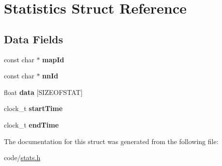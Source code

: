 \hypertarget{structStatistics}{}\section{Statistics Struct Reference}
\label{structStatistics}
\subsection*{Data Fields}
\begin{DoxyCompactItemize}
\item 
const char $\ast$ {\bfseries map\+Id}\hypertarget{structStatistics_afa28a4f362ea25039fd6848e43e226ae}{}\label{structStatistics_afa28a4f362ea25039fd6848e43e226ae}

\item 
const char $\ast$ {\bfseries nn\+Id}\hypertarget{structStatistics_a8da9020c160df0f5f9ca89e01ea6c0c5}{}\label{structStatistics_a8da9020c160df0f5f9ca89e01ea6c0c5}

\item 
float {\bfseries data} \mbox{[}S\+I\+Z\+E\+O\+F\+S\+T\+AT\mbox{]}\hypertarget{structStatistics_a1d650c93f141e5191d4ac30eb2aaf529}{}\label{structStatistics_a1d650c93f141e5191d4ac30eb2aaf529}

\item 
clock\+\_\+t {\bfseries start\+Time}\hypertarget{structStatistics_a44975fc2aaf4b2f2ff2f27b98d7ad03d}{}\label{structStatistics_a44975fc2aaf4b2f2ff2f27b98d7ad03d}

\item 
clock\+\_\+t {\bfseries end\+Time}\hypertarget{structStatistics_a72ecbe7906024837a97b260a3fd7a20b}{}\label{structStatistics_a72ecbe7906024837a97b260a3fd7a20b}

\end{DoxyCompactItemize}


The documentation for this struct was generated from the following file\+:\begin{DoxyCompactItemize}
\item 
code/\hyperlink{stats_8h}{stats.\+h}\end{DoxyCompactItemize}
